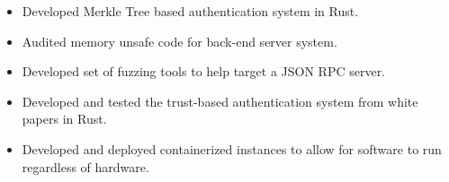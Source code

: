 \documentclass[
	9pt, %
]{FreemanCV}
\begin{document}
\begin{paracol}{2}
{	\begin{itemize}[noitemsep, topsep=0pt, partopsep=0pt, leftmargin=8pt]
	\item	Developed Merkle Tree based authentication system in Rust.
	\item	Audited memory unsafe code for back-end server system.
	\item	Developed set of fuzzing tools to help target a JSON RPC server.
	\item	Developed and tested the trust-based authentication system from white papers in Rust.
	\item	Developed and deployed containerized instances to allow for software to run regardless of hardware. 
\end{itemize}
	} %








	
	
	

\end{paracol}
\end{document}
